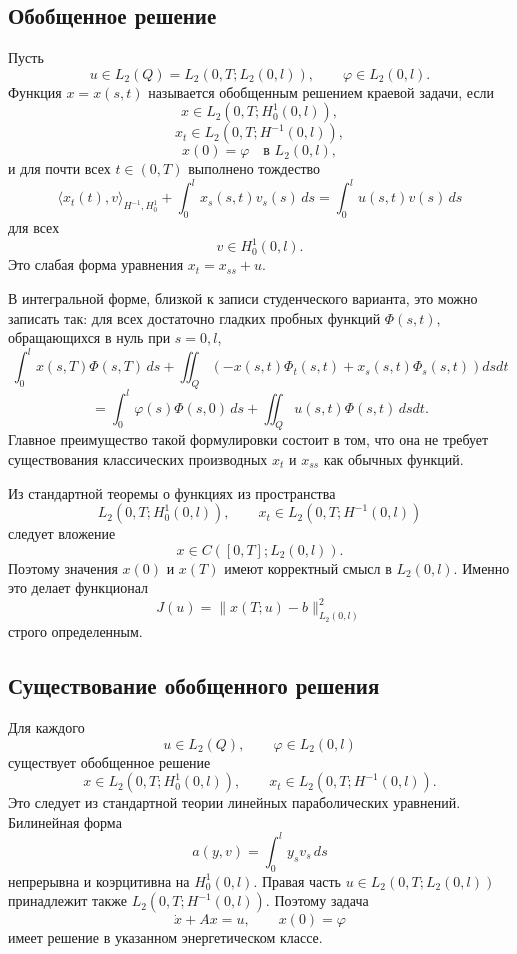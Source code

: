 \documentclass[12pt,a4paper]{article}
\begin{document}
\subsection*{Обобщенное решение}
Пусть
\[
u\in L_2(Q)=L_2(0,T;L_2(0,l)),
\qquad
\varphi\in L_2(0,l).
\]
Функция \(x=x(s,t)\) называется обобщенным решением краевой задачи, если
\[
x\in L_2(0,T;H_0^1(0,l)),
\]
\[
x_t\in L_2(0,T;H^{-1}(0,l)),
\]
\[
x(0)=\varphi\quad \text{в }L_2(0,l),
\]
и для почти всех \(t\in(0,T)\) выполнено тождество
\[
\langle x_t(t),v\rangle_{H^{-1},H_0^1}
+
\int_0^l x_s(s,t)v_s(s)\,ds
=
\int_0^l u(s,t)v(s)\,ds
\]
для всех
\[
v\in H_0^1(0,l).
\]
Это слабая форма уравнения \(x_t=x_{ss}+u\).

В интегральной форме, близкой к записи студенческого варианта, это можно записать так: для всех достаточно гладких пробных функций \(\Phi(s,t)\), обращающихся в нуль при \(s=0,l\),
\[
\int_0^l x(s,T)\Phi(s,T)\,ds
+
\iint_Q\left(-x(s,t)\Phi_t(s,t)+x_s(s,t)\Phi_s(s,t)\right)dsdt
\]
\[
=
\int_0^l \varphi(s)\Phi(s,0)\,ds
+
\iint_Q u(s,t)\Phi(s,t)\,dsdt.
\]
Главное преимущество такой формулировки состоит в том, что она не требует существования классических производных \(x_t\) и \(x_{ss}\) как обычных функций.

Из стандартной теоремы о функциях из пространства
\[
L_2(0,T;H_0^1(0,l)),
\qquad
x_t\in L_2(0,T;H^{-1}(0,l))
\]
следует вложение
\[
x\in C([0,T];L_2(0,l)).
\]
Поэтому значения \(x(0)\) и \(x(T)\) имеют корректный смысл в \(L_2(0,l)\). Именно это делает функционал
\[
J(u)=\|x(T;u)-b\|_{L_2(0,l)}^2
\]
строго определенным.

\subsection*{Существование обобщенного решения}
Для каждого
\[
u\in L_2(Q),
\qquad
\varphi\in L_2(0,l)
\]
существует обобщенное решение
\[
x\in L_2(0,T;H_0^1(0,l)),
\qquad
x_t\in L_2(0,T;H^{-1}(0,l)).
\]
Это следует из стандартной теории линейных параболических уравнений. Билинейная форма
\[
a(y,v)=\int_0^l y_s v_s\,ds
\]
непрерывна и коэрцитивна на \(H_0^1(0,l)\). Правая часть \(u\in L_2(0,T;L_2(0,l))\) принадлежит также \(L_2(0,T;H^{-1}(0,l))\). Поэтому задача
\[
\dot x+Ax=u,
\qquad x(0)=\varphi
\]
имеет решение в указанном энергетическом классе.
\end{document}
